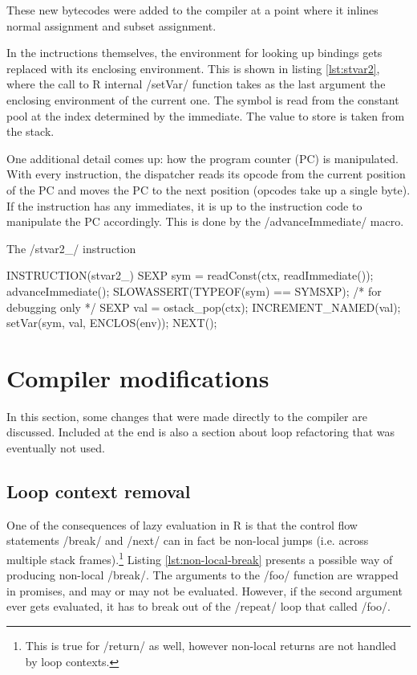 These new bytecodes were added to the compiler at a point where it inlines normal assignment and subset assignment.

In the inctructions themselves, the environment for looking up bindings gets replaced with its enclosing environment. This is shown in listing \ref{lst:stvar2}, where the call to R internal \cinline/setVar/ function takes as the last argument the enclosing environment of the current one. The symbol is read from the constant pool at the index determined by the immediate. The value to store is taken from the stack.

One additional detail comes up: how the program counter (PC) is manipulated. With every instruction, the dispatcher reads its opcode from the current position of the PC and moves the PC to the next position (opcodes take up a single byte). If the instruction has any immediates, it is up to the instruction code to manipulate the PC accordingly. This is done by the \cinline/advanceImmediate/ macro.

\begin{listing}[htbp]
  \caption{\label{lst:stvar2}The \cinline/stvar2_/ instruction}
  \begin{ccode}
INSTRUCTION(stvar2_) {
    SEXP sym = readConst(ctx, readImmediate());
    advanceImmediate();
    SLOWASSERT(TYPEOF(sym) == SYMSXP);  /* for debugging only */
    SEXP val = ostack_pop(ctx);
    INCREMENT_NAMED(val);
    setVar(sym, val, ENCLOS(env));
    NEXT();
}
  \end{ccode}
\end{listing}


\section{Compiler modifications}

In this section, some changes that were made directly to the compiler are discussed. Included at the end is also a section about loop refactoring that was eventually not used.


\subsection{Loop context removal}

One of the consequences of lazy evaluation in R is that the control flow statements \rinline/break/ and \rinline/next/ can in fact be non-local jumps (i.e. across multiple stack frames).\footnote{This is true for \rinline/return/ as well, however non-local returns are not handled by loop contexts.} Listing \ref{lst:non-local-break} presents a possible way of producing non-local \rinline/break/. The arguments to the \rinline/foo/ function are wrapped in promises, and may or may not be evaluated. However, if the second argument ever gets evaluated, it has to break out of the \rinline/repeat/ loop that called \rinline/foo/.

